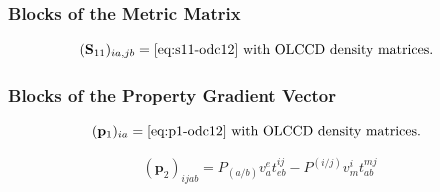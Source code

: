 \begin{subappendices}
    \subsubsection{Blocks of the Metric Matrix}

    \begin{equation}
        (\mathbf{S}_{11})_{ia,jb}
        =
        \text{%
            \Cref{eq:s11-odc12} with OLCCD density matrices.
        }
    \end{equation}

    \subsubsection{Blocks of the Property Gradient Vector}

    \begin{equation}
        (\mathbf{p}_1)_{ia}
        =
        \text{%
            \Cref{eq:p1-odc12} with OLCCD density matrices.
        }
    \end{equation}

    \begin{equation}
        (\mathbf{p}_2)_{ijab}
        =
        P_{(a/b)}
        v_a^e
        t_{eb}^{ij}
        -
        P^{(i/j)}
        v_m^i
        t_{ab}^{mj}
    \end{equation}

\end{subappendices}
